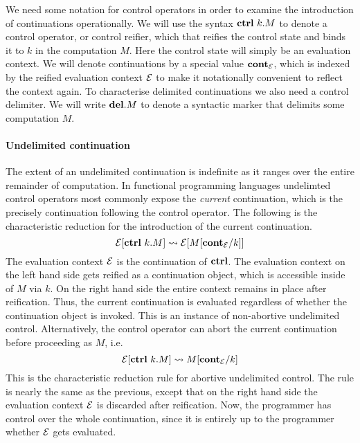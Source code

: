 \documentclass[12pt,phd,lfcs,twoside,openright,logo,leftchapter,normalheadings]{infthesis}
\theoremstyle{plain}
\theoremstyle{definition}
\begin{document}
We need some notation for control operators in order to examine the
introduction of continuations operationally. We will use the syntax
$\mathbf{ctrl}~k.M$ to denote a control operator, or control reifier, which that
reifies the control state and binds it to $k$ in the computation
$M$. Here the control state will simply be an evaluation context. We
will denote continuations by a special value $\mathbf{cont}_{\mathcal{E}}$, which is
indexed by the reified evaluation context $\mathcal{E}$ to make it
notationally convenient to reflect the context again. To characterise
delimited continuations we also need a control delimiter. We will
write $\mathbf{del}.M$ to denote a syntactic marker that delimits some
computation $M$.

\paragraph{Undelimited continuation} The extent of an undelimited
continuation is indefinite as it ranges over the entire remainder of
computation.
%
In functional programming languages undelimted control operators most
commonly expose the \emph{current} continuation, which is the
precisely continuation following the control operator. The following
is the characteristic reduction for the introduction of the current
continuation.
%
\[
  \mathcal{E}[\mathbf{ctrl}~k.M] \leadsto \mathcal{E}[M[\mathbf{cont}_{\mathcal{E}}/k]]
\]
%
The evaluation context $\mathcal{E}$ is the continuation of $\mathbf{ctrl}$. The
evaluation context on the left hand side gets reified as a
continuation object, which is accessible inside of $M$ via $k$. On the
right hand side the entire context remains in place after
reification. Thus, the current continuation is evaluated regardless of
whether the continuation object is invoked.  This is an instance of
non-abortive undelimited control. Alternatively, the control operator
can abort the current continuation before proceeding as $M$, i.e.
%
\[
  \mathcal{E}[\mathbf{ctrl}~k.M] \leadsto M[\mathbf{cont}_{\mathcal{E}}/k]
\]
%
This is the characteristic reduction rule for abortive undelimited
control. The rule is nearly the same as the previous, except that on
the right hand side the evaluation context $\mathcal{E}$ is discarded after
reification. Now, the programmer has control over the whole
continuation, since it is entirely up to the programmer whether $\mathcal{E}$
gets evaluated.
\end{document}
